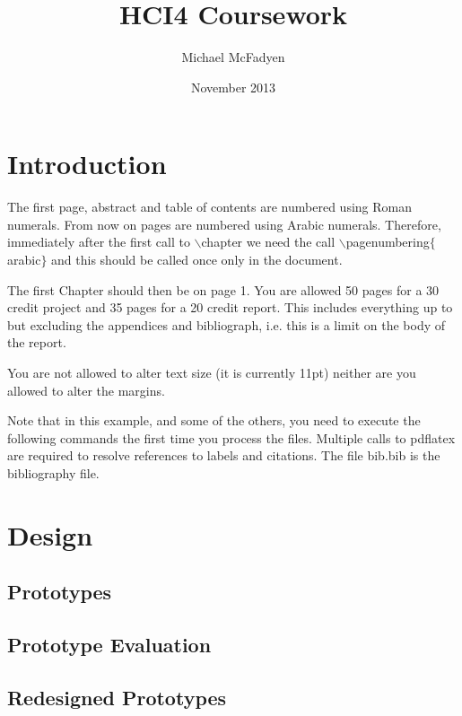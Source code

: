 \documentclass{l4proj}
\begin{document}
\title{HCI4 Coursework}
\author{Michael McFadyen}
\date{November 2013}
\maketitle

%
%
\tableofcontents

\chapter{Introduction}
The first page, abstract and table of contents are numbered using Roman numerals. From now on pages are numbered
using Arabic numerals. Therefore, immediately after the first call to $\backslash$chapter we need the call
$\backslash$pagenumbering$\{$arabic$\}$ and this should be called once only in the document. 

The first Chapter should then be on page 1. You are allowed 50 pages for a 30 credit project and 35 pages for a 
20 credit report. This includes everything up to but excluding the appendices and bibliograph, i.e. this is a limit on
the body of the report.

You are not allowed to alter text size (it is currently 11pt) neither are you allowed to alter the margins.

Note that in this example, and some of the others, you need to execute the following commands the first time you process the files.
Multiple calls to pdflatex are required to resolve references to labels and citations. The file bib.bib is the bibliography file.


\chapter{Design}

\section{Prototypes}

\section{Prototype Evaluation}

\section{Redesigned Prototypes}
\end{document}
